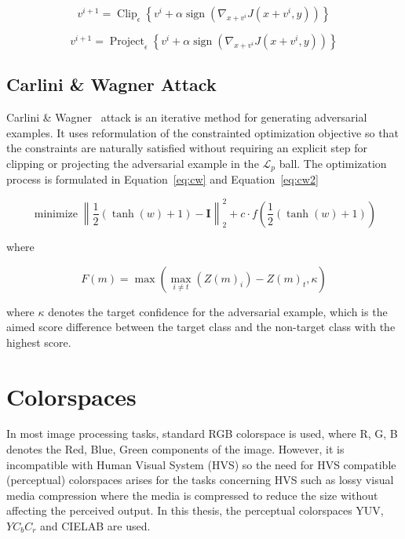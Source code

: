 \begin{equation}
    \label{eq:bim}
    v^{i+1}=\operatorname{Clip}_{\epsilon}\left\{v^{i}+\alpha \operatorname{sign}\left(\nabla_{x+v^{i}} J\left(x+v^{i}, y\right)\right)\right\}
\end{equation}

\begin{equation}
    \label{eq:pgd}
    v^{i+1}=\operatorname{Project}_{\epsilon}\left\{v^{i}+\alpha \operatorname{sign}\left(\nabla_{x+v^{i}} J\left(x+v^{i}, y\right)\right)\right\}
\end{equation}


\subsection{Carlini \& Wagner Attack}
Carlini \& Wagner~\cite{carlini2017towards} attack is an iterative method for generating adversarial examples. It uses reformulation of the constrainted optimization objective so that the constraints are naturally satisfied without requiring an explicit step for clipping or projecting the adversarial example in the \(\mathcal{L}_p\) ball. The optimization process is formulated in Equation~\ref{eq:cw} and Equation~\ref{eq:cw2}

\begin{equation}
    \label{eq:cw}
    \operatorname{minimize}\left\|\frac{1}{2}(\tanh (w)+1)-\boldsymbol{I}\right\|_{2}^{2}+c \cdot f\left(\frac{1}{2}(\tanh (w)+1)\right)
\end{equation}

where

\begin{equation}
    \label{eq:cw2}
    F(m)=\max \left(\max _{i \neq t}\left(Z(m)_{i}\right)-Z(m)_{t}, \kappa\right)
\end{equation}

where \(\kappa\) denotes the target confidence for the adversarial example, which is the aimed score difference between the target class and the non-target class with the highest score.



\section{Colorspaces}
In most image processing tasks, standard RGB colorspace is used, where R, G, B denotes the Red, Blue, Green components of the image. However, it is incompatible with Human Visual System (HVS) so the need for HVS compatible (perceptual) colorspaces arises for the tasks concerning HVS such as lossy visual media compression where the media is compressed to reduce the size without affecting the perceived output. In this thesis, the perceptual colorspaces YUV, \(YC_{b}C_{r}\) and CIELAB are used.

